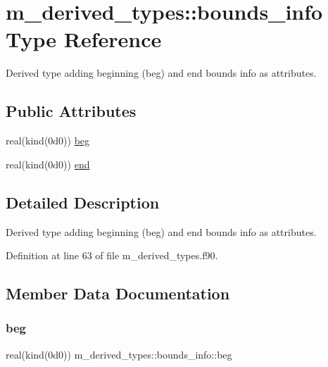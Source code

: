 \hypertarget{structm__derived__types_1_1bounds__info}{}\section{m\+\_\+derived\+\_\+types\+:\+:bounds\+\_\+info Type Reference}
\label{structm__derived__types_1_1bounds__info}


Derived type adding beginning (beg) and end bounds info as attributes.  


\subsection*{Public Attributes}
\begin{DoxyCompactItemize}
\item 
real(kind(0d0)) \hyperlink{structm__derived__types_1_1bounds__info_ad6610dadbbe36b75710f979fed336cd5}{beg}
\item 
real(kind(0d0)) \hyperlink{structm__derived__types_1_1bounds__info_af45e47c874ec834cddb38daa755c9cab}{end}
\end{DoxyCompactItemize}


\subsection{Detailed Description}
Derived type adding beginning (beg) and end bounds info as attributes. 

Definition at line 63 of file m\+\_\+derived\+\_\+types.\+f90.



\subsection{Member Data Documentation}
\mbox{\label{structm__derived__types_1_1bounds__info_ad6610dadbbe36b75710f979fed336cd5}} 
\subsubsection{\texorpdfstring{beg}{beg}}
{\footnotesize\ttfamily real(kind(0d0)) m\+\_\+derived\+\_\+types\+::bounds\+\_\+info\+::beg}



